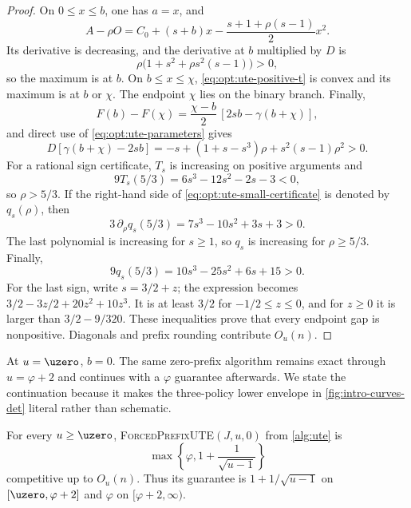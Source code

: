 \begin{proof}
On $0\le x\le b$, one has $a=x$, and
\begin{equation}
 A-\rho O=C_0+(s+b)x
 -\frac{s+1+\rho(s-1)}2x^2.
 \label{eq:opt:ute-small-x}
\end{equation}
Its derivative is decreasing, and the derivative at $b$ multiplied by $D$
is
\begin{equation}
 \rho\bigl(1+s^2+\rho s^2(s-1)\bigr)>0,
\end{equation}
so the maximum is at $b$.  On $b\le x\le\chi$,
\cref{eq:opt:ute-positive-t} is convex and its maximum is at $b$ or $\chi$.
The endpoint $\chi$ lies on the binary branch.  Finally,
\begin{equation}
 F(b)-F(\chi)
 =\frac{\chi-b}{2}\,[2sb-\gamma(b+\chi)],
\end{equation}
and direct use of \cref{eq:opt:ute-parameters} gives
\begin{equation}
 D[\gamma(b+\chi)-2sb]
 =-s+(1+s-s^3)\rho+s^2(s-1)\rho^2>0.
 \label{eq:opt:ute-small-certificate}
\end{equation}
For a rational sign certificate, $T_s$ is increasing on positive arguments
and
\begin{equation}
 9T_s(5/3)=6s^3-12s^2-2s-3<0,
\end{equation}
so $\rho>5/3$.  If the right-hand side of
\cref{eq:opt:ute-small-certificate} is denoted by $q_s(\rho)$, then
\begin{equation}
 3\,\partial_\rho q_s(5/3)=7s^3-10s^2+3s+3>0.
\end{equation}
The last polynomial is increasing for $s\ge1$, so $q_s$ is increasing for
$\rho\ge5/3$.  Finally,
\begin{equation}
 9q_s(5/3)=10s^3-25s^2+6s+15>0.
\end{equation}
For the last sign, write $s=3/2+z$; the expression becomes
$3/2-3z/2+20z^2+10z^3$.  It is at least $3/2$ for
$-1/2\le z\le0$, and for $z\ge0$ it is larger than
$3/2-9/320$.  These inequalities prove that every endpoint gap is
nonpositive.  Diagonals and prefix rounding contribute $O_u(n)$.
\end{proof}

At $u=\uzero$, $b=0$.  The same zero-prefix algorithm remains exact through
$u=\varphi+2$ and continues with a $\varphi$ guarantee afterwards.  We state
the continuation because it makes the three-policy lower envelope in
\cref{fig:intro-curves-det} literal rather than schematic.

\begin{lemma}
\label{lem:opt:zero-prefix}
For every $u\ge \uzero$,
\textnormal{\textsc{ForcedPrefixUTE}}$(J,u,0)$ from \cref{alg:ute} is
\begin{equation}
 \max\left\{\varphi,1+\frac1{\sqrt{u-1}}\right\}
 \label{eq:opt:zero-prefix-full-guarantee}
\end{equation}
competitive up to $O_u(n)$.  Thus its guarantee is
$1+1/\sqrt{u-1}$ on $[\uzero,\varphi+2]$ and $\varphi$ on
$[\varphi+2,\infty)$.
\end{lemma}

